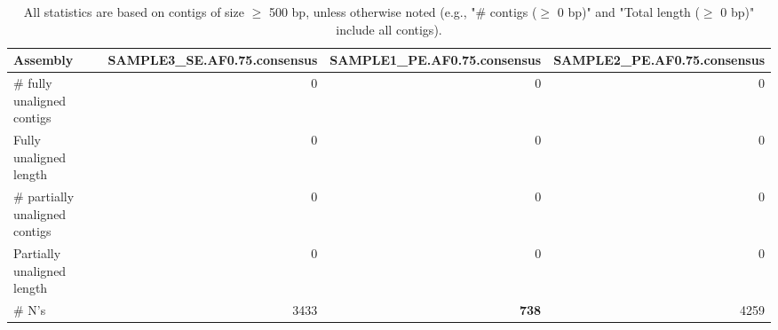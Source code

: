 \documentclass[12pt,a4paper]{article}
\begin{document}
\begin{table}[ht]
\begin{center}
\caption{All statistics are based on contigs of size $\geq$ 500 bp, unless otherwise noted (e.g., "\# contigs ($\geq$ 0 bp)" and "Total length ($\geq$ 0 bp)" include all contigs).}
\begin{tabular}{|l*{3}{|r}|}
\hline
Assembly & SAMPLE3\_SE.AF0.75.consensus & SAMPLE1\_PE.AF0.75.consensus & SAMPLE2\_PE.AF0.75.consensus \\ \hline
\# fully unaligned contigs & 0 & 0 & 0 \\ \hline
Fully unaligned length & 0 & 0 & 0 \\ \hline
\# partially unaligned contigs & 0 & 0 & 0 \\ \hline
Partially unaligned length & 0 & 0 & 0 \\ \hline
\# N's & 3433 & {\bf 738} & 4259 \\ \hline
\end{tabular}
\end{center}
\end{table}
\end{document}
